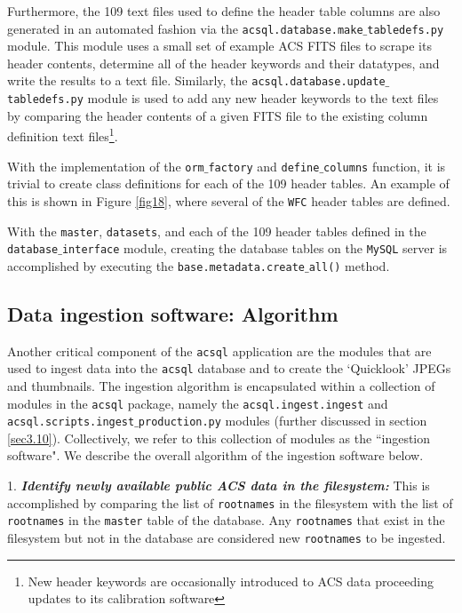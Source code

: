 \documentclass[10pt,journal,compsoc]{IEEEtran}
\begin{document}
Furthermore, the 109 text files used to define the header table columns are also generated in an automated fashion via the \texttt{acsql.database.make$\_$tabledefs.py} module.  This
module uses a small set of example ACS FITS files to scrape its header contents, determine all of the header keywords and their datatypes, and write the results to a text file.
Similarly, the \texttt{acsql.database.update$\_$tabledefs.py} module is used to add any new header keywords to the text files by comparing the header contents of a given FITS file to
the existing column definition text files\footnote{New header keywords are occasionally introduced to ACS data proceeding updates to its calibration software}.

With the implementation of the \texttt{orm$\_$factory} and \texttt{define$\_$columns} function, it is trivial to create class definitions for each of the 109 header tables.  An
example of this is shown in Figure \ref{fig18}, where several of the \texttt{WFC} header tables are defined.

With the \texttt{master}, \texttt{datasets}, and each of the 109 header tables defined in the \texttt{database$\_$interface} module, creating the database tables on the \texttt{MySQL}
server is accomplished by executing the \texttt{base.metadata.create$\_$all()} method.


\subsection{Data ingestion software: Algorithm} \label{sec3.7}

Another critical component of the \texttt{acsql} application are the modules that are used to ingest data into the \texttt{acsql} database and to create the `Quicklook' JPEGs and
thumbnails. The ingestion algorithm is encapsulated within a collection of modules in the \texttt{acsql} package, namely the \texttt{acsql.ingest.ingest} and
\texttt{acsql.scripts.ingest$\_$production.py} modules (further discussed in section \ref{sec3.10}).  Collectively, we refer to this collection of modules as the ``ingestion software".
We describe the overall algorithm of the ingestion software below.

1. \textbf{\textit{Identify newly available public ACS data in the filesystem:}}  This is accomplished by comparing the list of \texttt{rootnames} in the filesystem with the list
of \texttt{rootnames} in the \texttt{master} table of the database.  Any \texttt{rootnames} that exist in the filesystem but not in the database are considered new \texttt{rootnames} to
be ingested.
\end{document}
